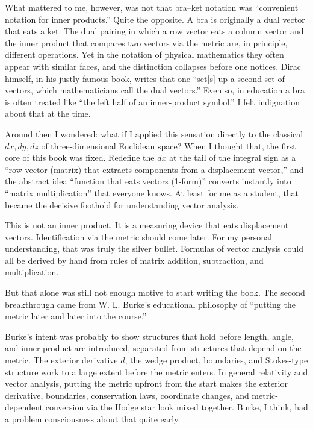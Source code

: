 What mattered to me, however, was not that bra--ket notation was
``convenient notation for inner products.'' Quite the opposite. A bra is
originally a dual vector that eats a ket. The dual pairing in which a
row vector eats a column vector and the inner product that compares two
vectors via the metric are, in principle, different operations. Yet in
the notation of physical mathematics they often appear with similar
faces, and the distinction collapses before one notices. Dirac himself,
in his justly famous book, writes that one ``set{[}s{]} up a second set
of vectors, which mathematicians call the dual vectors.'' Even so, in
education a bra is often treated like ``the left half of an
inner-product symbol.'' I felt indignation about that at the time.

Around then I wondered: what if I applied this sensation directly to the
classical \(dx,dy,dz\) of three-dimensional Euclidean space? When I
thought that, the first core of this book was fixed. Redefine the \(dx\)
at the tail of the integral sign as a ``row vector (matrix) that
extracts components from a displacement vector,'' and the abstract idea
``function that eats vectors (1-form)'' converts instantly into ``matrix
multiplication'' that everyone knows. At least for me as a student, that
became the decisive foothold for understanding vector analysis.

This is not an inner product. It is a measuring device that eats
displacement vectors. Identification via the metric should come later.
For my personal understanding, that was truly the silver bullet.
Formulas of vector analysis could all be derived by hand from rules of
matrix addition, subtraction, and multiplication.

But that alone was still not enough motive to start writing the book.
The second breakthrough came from W. L. Burke's educational philosophy
of ``putting the metric later and later into the course.''

Burke's intent was probably to show structures that hold before length,
angle, and inner product are introduced, separated from structures that
depend on the metric. The exterior derivative \(d\), the wedge product,
boundaries, and Stokes-type structure work to a large extent before the
metric enters. In general relativity and vector analysis, putting the
metric upfront from the start makes the exterior derivative, boundaries,
conservation laws, coordinate changes, and metric-dependent conversion
via the Hodge star look mixed together. Burke, I think, had a problem
consciousness about that quite early.

